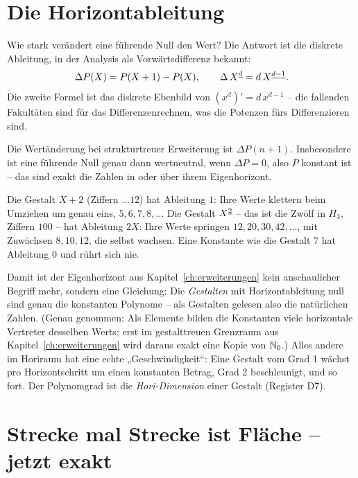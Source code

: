 \section{Die Horizontableitung}

Wie stark verändert eine führende Null den Wert? Die Antwort ist
die diskrete Ableitung, in der Analysis als Vorwärtsdifferenz
bekannt:
\[
\Delta P(X)=P(X+1)-P(X),
\qquad
\Delta\,X^{\underline{d}}=d\,X^{\underline{d-1}}.
\]
Die zweite Formel ist das diskrete Ebenbild von
$(x^d)'=d\,x^{d-1}$ -- die fallenden Fakultäten sind für das
Differenzenrechnen, was die Potenzen fürs Differenzieren sind.

\begin{satz}[Register S7]
Die Wertänderung bei strukturtreuer Erweiterung ist
$\Delta P(n+1)$. Insbesondere ist eine führende Null genau dann
wertneutral, wenn $\Delta P=0$, also $P$ konstant ist -- das sind
exakt die Zahlen in oder über ihrem Eigenhorizont.
\end{satz}

\begin{beispiel}
Die Gestalt $X+2$ (Ziffern $\ldots12$) hat Ableitung $1$: Ihre Werte
klettern beim Umziehen um genau eins, $5,6,7,8,\ldots$ Die Gestalt
$X^{\underline{2}}$ -- das ist die Zwölf in $H_3$, Ziffern $100$ -- hat
Ableitung $2X$: Ihre Werte springen $12, 20, 30, 42,\ldots$, mit
Zuwächsen $8, 10, 12$, die selbst wachsen. Eine Konstante wie die
Gestalt $7$ hat Ableitung $0$ und rührt sich nie.
\end{beispiel}

Damit ist der Eigenhorizont aus Kapitel~\ref{ch:erweiterungen} kein
anschaulicher Begriff mehr, sondern eine Gleichung: Die
\emph{Gestalten} mit Horizontableitung null sind genau die
konstanten Polynome -- als Gestalten gelesen also die natürlichen
Zahlen. (Genau genommen: Als Elemente bilden die Konstanten viele
horizontale Vertreter desselben Werts; erst im gestalttreuen
Grenzraum aus Kapitel~\ref{ch:erweiterungen} wird daraus exakt eine
Kopie von $\mathbb N_0$.) Alles andere im Horiraum hat eine
echte „Geschwindigkeit“: Eine Gestalt vom Grad 1 wächst pro
Horizontschritt um einen konstanten Betrag, Grad 2 beschleunigt,
und so fort. Der Polynomgrad ist die \emph{Hori-Dimension} einer
Gestalt (Register D7).

\section{Strecke mal Strecke ist Fläche -- jetzt exakt}


